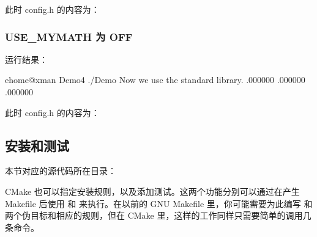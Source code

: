 \documentclass[a4paper,12pt,english]{sphinxmanual}
\begin{document}
\sphinxAtStartPar
此时 config.h 的内容为：

\begin{sphinxVerbatim}[commandchars=\\\{\}]
\end{sphinxVerbatim}


\subsubsection{USE\_MYMATH 为 OFF}
\label{\detokenize{dev-board/cmake:use-mymath-off}}
\sphinxAtStartPar
运行结果：

\begin{sphinxVerbatim}[commandchars=\\\{\}]
\PYG{o}{[}ehome@xman Demo4\PYG{o}{]}\PYGZdl{} ./Demo
Now we use the standard library.
  \PYGZca{}   .000000
  \PYGZca{}   .000000
  \PYGZca{}   .000000
\end{sphinxVerbatim}

\sphinxAtStartPar
此时 config.h 的内容为：

\begin{sphinxVerbatim}[commandchars=\\\{\}]
\end{sphinxVerbatim}


\subsection{安装和测试}
\label{\detokenize{dev-board/cmake:id8}}
\sphinxAtStartPar
本节对应的源代码所在目录：
\begin{quote}

\sphinxAtStartPar
{}
\end{quote}

\sphinxAtStartPar
CMake 也可以指定安装规则，以及添加测试。这两个功能分别可以通过在产生 Makefile 后使用  和  来执行。在以前的 GNU Makefile 里，你可能需要为此编写  和  两个伪目标和相应的规则，但在 CMake 里，这样的工作同样只需要简单的调用几条命令。
\end{document}
